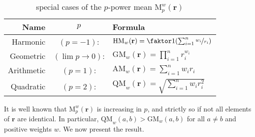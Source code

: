 \documentclass[twoside]{article}
\theoremstyle{plain}
\theoremstyle{definition}
\begin{document}
\begin{table}
\centering
\renewcommand{\arraystretch}{1.5} %
\begin{tabular}{rcl}
	\textbf{Name} & $p$ & \textbf{Formula}\\\hline
	Harmonic&$(p=-1)$:& $\mathrm{HM}_w(\mathbf r) = \faktor1{\left(\sum_{i=1}^n \nicefrac{w_i}{r_i}\right)}$ \\
	Geometric&$(\lim {p\to 0})$:& $\mathrm{GM}_w(\mathbf r) = \prod_{i=1}^n r_i^{w_i}$ \\
	Arithmetic&$(p=1)$:& $\mathrm{AM}_w(\mathbf r) = \sum_{i=1}^n w_i r_i$ \\
	Quadratic&$(p=2)$:& $\mathrm{QM}_w(\mathbf r) = \sqrt{\textstyle\sum_{i=1}^n w_i r_i^2}$\\\hline
	\end{tabular}
	\caption{special cases of the $p$-power mean $\mathrm M_p^w(\mathbf r)$}
	\label{tab:power-means}
\end{table}

It is well known that $\mathrm M_p^w(\mathbf r)$ is increasing in $p$, and strictly so if not all elements of $\mathbf r$ are identical. In particular, $\mathrm{QM}_w(a,b) > \mathrm{GM}_w(a,b)$ for all $a \ne b$ and positive weights $w$. We now present the result.
\end{document}
